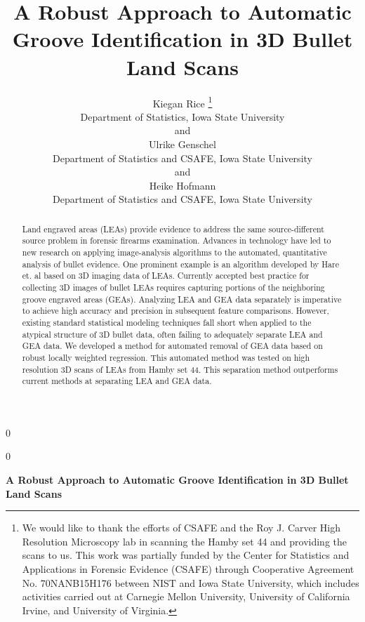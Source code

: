 \documentclass[12pt]{article}
\newcommand{\blind}{0}
\begin{document}
\def\spacingset#1{\renewcommand{\baselinestretch}%
{#1}\small\normalsize} \spacingset{1}




\blind
{
  \title{\bf A Robust Approach to Automatic Groove Identification in 3D Bullet Land
Scans}

  \author{
        Kiegan Rice \thanks{We would like to thank the efforts of CSAFE and the Roy J. Carver High
Resolution Microscopy lab in scanning the Hamby set 44 and providing the
scans to us. This work was partially funded by the Center for Statistics
and Applications in Forensic Evidence (CSAFE) through Cooperative
Agreement No. 70NANB15H176 between NIST and Iowa State University, which
includes activities carried out at Carnegie Mellon University,
University of California Irvine, and University of Virginia.} \\
    Department of Statistics, Iowa State University\\
     and \\     Ulrike Genschel \\
    Department of Statistics and CSAFE, Iowa State University\\
     and \\     Heike Hofmann \\
    Department of Statistics and CSAFE, Iowa State University\\
      }
  \maketitle
} \fi

\blind
{
  \bigskip
  \bigskip
  \bigskip
  \begin{center}
    {\LARGE\bf A Robust Approach to Automatic Groove Identification in 3D Bullet Land
Scans}
  \end{center}
  \medskip
} \fi

\bigskip
\begin{abstract}
Land engraved areas (LEAs) provide evidence to address the same
source-different source problem in forensic firearms examination.
Advances in technology have led to new research on applying
image-analysis algorithms to the automated, quantitative analysis of
bullet evidence. One prominent example is an algorithm developed by Hare
et. al \citep{Hare1} based on 3D imaging data of LEAs. Currently
accepted best practice for collecting 3D images of bullet LEAs requires
capturing portions of the neighboring groove engraved areas (GEAs).
Analyzing LEA and GEA data separately is imperative to achieve high
accuracy and precision in subsequent feature comparisons. However,
existing standard statistical modeling techniques fall short when
applied to the atypical structure of 3D bullet data, often failing to
adequately separate LEA and GEA data. We developed a method for
automated removal of GEA data based on robust locally weighted
regression. This automated method was tested on high resolution 3D scans
of LEAs from Hamby set 44. This separation method outperforms current
methods at separating LEA and GEA data.
\end{abstract}
\end{document}
